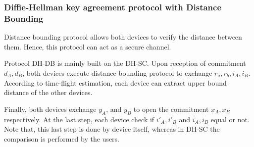 \begin{center}
\end{center}
\subsubsection*{Diffie-Hellman key agreement protocol with Distance Bounding}

Distance bounding protocol allows both devices to verify the distance between them. Hence, this protocol can act as a secure channel. 

Protocol DH-DB is mainly built on the DH-SC. Upon reception of commitment $d_A,d_B$, both devices execute distance bounding protocol to exchange $r_a,r_b, i_A, i_B$. According to time-flight estimation, each device can extract upper bound distance of the other devices. 

Finally, both devices exchange $y_A$, and $y_B$ to open the commitment $x_A, x_B$ respectively. At the last step, each device check if $i'_A,i'_B$ and $i_A,i_B$ equal or not.  Note that, this last step is done by device itself, whereas in DH-SC the comparison is performed by the users. 

